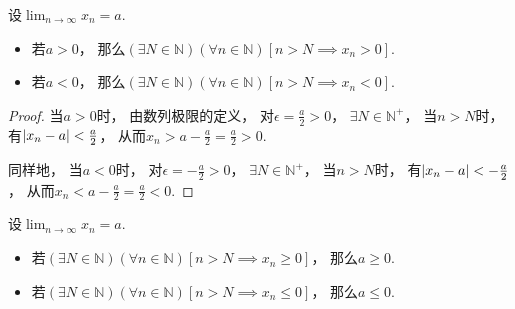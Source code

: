 \begin{corollary}[保号性]\label{theorem:极限.收敛数列的保号性1}
设\(\lim_{n\to\infty} x_n = a\).
\begin{itemize}
	\item 若\(a > 0\)，
	那么\((\exists N\in\mathbb{N})
	(\forall n\in\mathbb{N})
	[n>N \implies x_n > 0]\).

	\item 若\(a < 0\)，
	那么\((\exists N\in\mathbb{N})
	(\forall n\in\mathbb{N})
	[n>N \implies x_n < 0]\).
\end{itemize}
\begin{proof}
当\(a > 0\)时，
由数列极限的定义，
对\(\epsilon = \frac{a}{2} > 0\)，
\(\exists N \in \mathbb{N}^+\)，
当\(n > N\)时，
有\(\abs{x_n - a} < \frac{a}{2}\)，
从而\(x_n > a - \frac{a}{2} = \frac{a}{2} > 0\).

同样地，
当\(a < 0\)时，
对\(\epsilon = -\frac{a}{2} > 0\)，
\(\exists N \in \mathbb{N}^+\)，
当\(n > N\)时，
有\(\abs{x_n - a} < -\frac{a}{2}\)，
从而\(x_n < a - \frac{a}{2} = \frac{a}{2} < 0\).
\end{proof}
\end{corollary}

\begin{corollary}\label{theorem:极限.收敛数列的保号性2}
设\(\lim_{n\to\infty} x_n = a\).
\begin{itemize}
	\item 若\((\exists N\in\mathbb{N})
	(\forall n\in\mathbb{N})
	[n > N \implies x_n \geq 0]\)，
	那么\(a \geq 0\).

	\item 若\((\exists N\in\mathbb{N})
	(\forall n\in\mathbb{N})
	[n > N \implies x_n \leq 0]\)，
	那么\(a \leq 0\).
\end{itemize}
\end{corollary}

